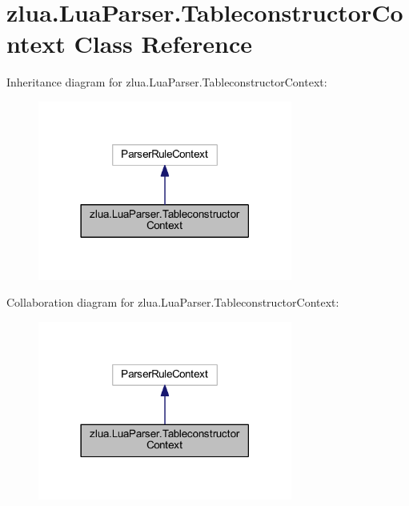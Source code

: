 \hypertarget{classzlua_1_1_lua_parser_1_1_tableconstructor_context}{}\section{zlua.\+Lua\+Parser.\+Tableconstructor\+Context Class Reference}
\label{classzlua_1_1_lua_parser_1_1_tableconstructor_context}


Inheritance diagram for zlua.\+Lua\+Parser.\+Tableconstructor\+Context\+:
\nopagebreak
\begin{figure}[H]
\begin{center}
\leavevmode
\includegraphics[width=237pt]{classzlua_1_1_lua_parser_1_1_tableconstructor_context__inherit__graph}
\end{center}
\end{figure}


Collaboration diagram for zlua.\+Lua\+Parser.\+Tableconstructor\+Context\+:
\nopagebreak
\begin{figure}[H]
\begin{center}
\leavevmode
\includegraphics[width=237pt]{classzlua_1_1_lua_parser_1_1_tableconstructor_context__coll__graph}
\end{center}
\end{figure}
